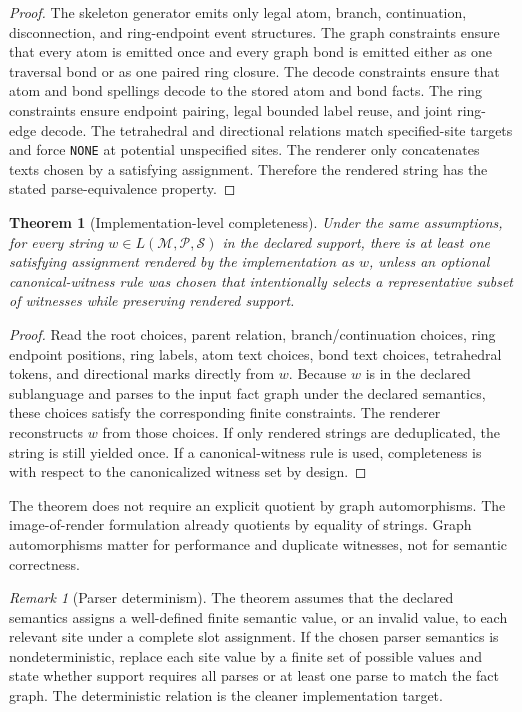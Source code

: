 \documentclass[10pt,a4paper]{article}
\newcommand{\calM}{\mathcal M}
\newcommand{\calP}{\mathcal P}
\newcommand{\calS}{\mathcal S}
\newtheorem{theorem}[lemma]{Theorem}
\theoremstyle{definition}
\theoremstyle{remark}
\newtheorem{remark}[lemma]{Remark}
\begin{document}
\begin{proof}
The skeleton generator emits only legal atom, branch, continuation,
disconnection, and ring-endpoint event structures.  The graph constraints ensure
that every atom is emitted once and every graph bond is emitted either as one
traversal bond or as one paired ring closure.  The decode constraints ensure
that atom and bond spellings decode to the stored atom and bond facts.  The ring
constraints ensure endpoint pairing, legal bounded label reuse, and joint
ring-edge decode.  The tetrahedral and directional relations match specified-site
targets and force \texttt{NONE} at potential unspecified sites.  The renderer
only concatenates texts chosen by a satisfying assignment.  Therefore the
rendered string has the stated parse-equivalence property.
\end{proof}

\begin{theorem}[Implementation-level completeness]
Under the same assumptions, for every string \(w\in L(\calM,\calP,\calS)\) in
the declared support, there is at least one satisfying assignment rendered by
the implementation as \(w\), unless an optional canonical-witness rule was chosen
that intentionally selects a representative subset of witnesses while preserving
rendered support.
\end{theorem}

\begin{proof}
Read the root choices, parent relation, branch/continuation choices, ring
endpoint positions, ring labels, atom text choices, bond text choices,
tetrahedral tokens, and directional marks directly from \(w\).  Because \(w\) is
in the declared sublanguage and parses to the input fact graph under the declared
semantics, these choices satisfy the corresponding finite constraints.  The
renderer reconstructs \(w\) from those choices.  If only rendered strings are
deduplicated, the string is still yielded once.  If a canonical-witness rule is
used, completeness is with respect to the canonicalized witness set by design.
\end{proof}

The theorem does not require an explicit quotient by graph automorphisms.  The
image-of-render formulation already quotients by equality of strings.  Graph
automorphisms matter for performance and duplicate witnesses, not for semantic
correctness.

\begin{remark}[Parser determinism]
The theorem assumes that the declared semantics assigns a well-defined finite
semantic value, or an invalid value, to each relevant site under a complete slot
assignment.  If the chosen parser semantics is nondeterministic, replace each
site value by a finite set of possible values and state whether support requires
all parses or at least one parse to match the fact graph.  The deterministic
relation is the cleaner implementation target.
\end{remark}
\end{document}
